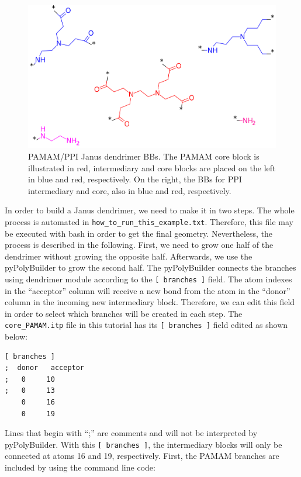 \begin{figure}
    \centering
    \includegraphics[width=\textwidth]{PAMAM_PPI-Janus/JANUSBBs.png}
    \caption{PAMAM/PPI Janus dendrimer BBs. The PAMAM core block is illustrated in red, intermediary and core blocks are placed on the left in blue and red, respectively. On the right, the BBs for PPI intermediary and core, also in blue and red, respectively.}
    \label{fig:JanusBBs}
\end{figure}

In order to build a Janus dendrimer, we need to make it in two steps.
The whole process is automated in \texttt{how\_to\_run\_this\_example.txt}.
Therefore, this file may be executed with bash in order to get the final geometry.
Nevertheless, the process is described in the following.
First, we need to grow one half of the dendrimer without growing the opposite half.
Afterwards, we use the pyPolyBuilder to grow the second half.
The pyPolyBuilder connects the branches using dendrimer module according to the \texttt{[ branches ]} field.
The atom indexes in the ``acceptor'' column will receive a new bond from the atom in the ``donor'' column in the incoming new intermediary block.
Therefore, we can edit this field in order to select which branches will be created in each step.
The \texttt{core\_PAMAM.itp} file in this tutorial has its \texttt{[ branches ]} field edited as shown below:

\begin{lstlisting}
[ branches ]
;  donor   acceptor
;   0     10
;   0     13
    0     16
    0     19
\end{lstlisting}

Lines that begin with ``;'' are comments and will not be interpreted by pyPolyBuilder.
With this \texttt{[ branches ]}, the intermediary blocks will only be connected at atoms 16 and 19, respectively.
First, the PAMAM branches are included by using the command line code:

